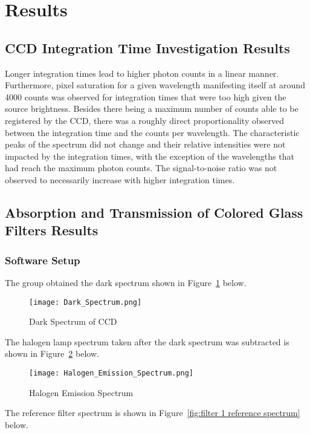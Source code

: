 \documentclass{article}
\begin{document}
\section{Results}
\subsection{CCD Integration Time Investigation Results}
Longer integration times lead to higher photon counts in a linear manner. Furthermore, pixel saturation for a given wavelength manifesting itself at around 4000 counts was observed for integration times that were too high given the source brightness. Besides there being a maximum number of counts able to be registered by the CCD, there was a roughly direct proportionality observed between the integration time and the counts per wavelength. The characteristic peaks of the spectrum did not change and their relative intensities were not impacted by the integration times, with the exception of the wavelengths that had reach the maximum photon counts. The signal-to-noise ratio was not observed to necessarily increase with higher integration times.

\subsection{Absorption and Transmission of Colored Glass Filters Results}

\subsubsection{Software Setup}

The group obtained the dark spectrum shown in Figure~\ref{fig:dark spectrum} below.
\begin{figure} [h!]
    \centering
    \texttt{[image: Dark\_Spectrum.png]}
    \caption{Dark Spectrum of CCD}
    \label{fig:dark spectrum}
\end{figure}

The halogen lamp spectrum taken after the dark spectrum was subtracted is shown in Figure~\ref{fig:halogen lamp spectrum} below.

\begin{figure} [h!]
    \centering
    \texttt{[image: Halogen\_Emission\_Spectrum.png]}
    \caption{Halogen Emission Spectrum}
    \label{fig:halogen lamp spectrum}
\end{figure}

The reference filter spectrum is shown in Figure~\ref{fig:filter 1 reference spectrum} below.
\end{document}
